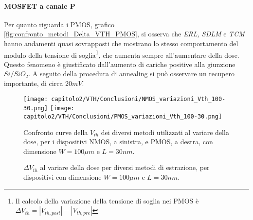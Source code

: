 \paragraph*{MOSFET a canale P} Per quanto riguarda i PMOS, grafico \ref{fig:confronto_metodi_Delta_VTH_PMOS}, si osserva che \textit{ERL, SDLM} e \textit{TCM} hanno andamenti quasi sovrapposti che mostrano lo stesso comportamento del modulo della tensione di soglia\footnote{Il calcolo della variazione della tensione di soglia nei PMOS è $\Delta V_{th} = |V_{th,post}| - |V_{th,pre}|$}, che aumenta sempre all'aumentare della dose. Questo fenomeno è giustificato dall'aumento di cariche positive alla giunzione $Si/SiO_2$. A seguito della procedura di annealing si può osservare un recupero importante, di circa $20mV$.

\begin{figure}[ht]

  \centering
  \texttt{[image: capitolo2/VTH/Conclusioni/NMOS\_variazioni\_Vth\_100-30.png]}
  \texttt{[image: capitolo2/VTH/Conclusioni/PMOS\_variazioni\_Vth\_100-30.png]}

  \caption[Confronto curve della $V_{th}$ dei diversi metodi utilizzati al variare della dose]{Confronto curve della $V_{th}$ dei diversi metodi utilizzati al variare della dose, per i dispositivi NMOS, a sinistra, e PMOS, a destra, con dimensione $ W=100\mu m$ e $L = 30nm$.}
  \label{fig:confronto_metodi_VTH}
  
\end{figure}

\begin{figure}[ht]

  \centering

  \caption[$\Delta V_{th}$ al variare della dose per diversi metodi di estrazione]{$\Delta V_{th}$ al variare della dose per diversi metodi di estrazione, per dispositivi con dimensione $ W=100\mu m$ e $L = 30nm$.}
  \label{fig:confronto_metodi_Delta_VTH}
  
\end{figure}